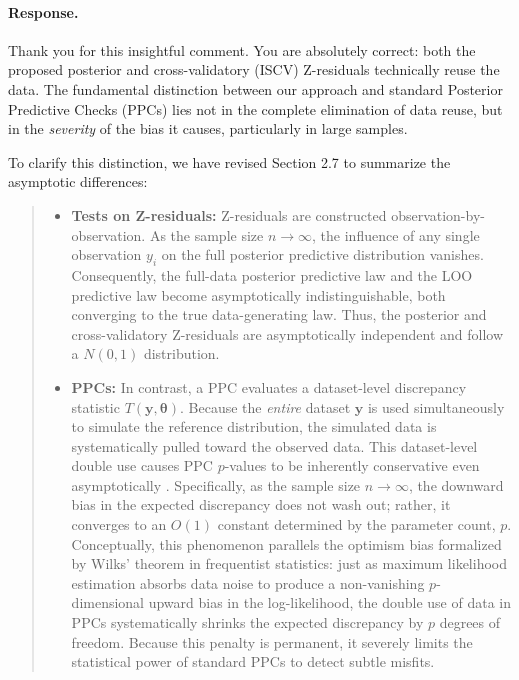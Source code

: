 \documentclass[11pt]{article}
\begin{document}
\paragraph{Response.}
Thank you for this insightful comment. You are absolutely correct: both the proposed posterior and cross-validatory (ISCV) Z-residuals technically reuse the data. The fundamental distinction between our approach and standard Posterior Predictive Checks (PPCs) lies not in the complete elimination of data reuse, but in the \textit{severity} of the bias it causes, particularly in large samples.

To clarify this distinction, we have revised Section 2.7 to summarize the asymptotic differences:

\begin{quote}
    
\begin{itemize}
    \item \textbf{Tests on Z-residuals:} Z-residuals are constructed observation-by-observation. As the sample size $n\to \infty$, the influence of any single observation $y_i$ on the full posterior predictive distribution vanishes. Consequently, the full-data posterior predictive law and the LOO predictive law become asymptotically indistinguishable, both converging to the true data-generating law. Thus, the posterior and cross-validatory Z-residuals are asymptotically independent and follow a $N(0,1)$ distribution.
    
    \item \textbf{PPCs:} In contrast, a PPC evaluates a dataset-level discrepancy statistic $T(\mathbf{y}, \boldsymbol{\theta})$. Because the \textit{entire} dataset $\mathbf{y}$ is used simultaneously to simulate the reference distribution, the simulated data is systematically pulled toward the observed data. This dataset-level double use causes PPC $p$-values to be inherently conservative even asymptotically \citep{Robins2000}. Specifically, as the sample size $n \to \infty$, the downward bias in the expected discrepancy does not wash out; rather, it converges to an $O(1)$ constant determined by the parameter count, $p$. Conceptually, this phenomenon parallels the optimism bias formalized by Wilks' theorem in frequentist statistics: just as maximum likelihood estimation absorbs data noise to produce a non-vanishing $p$-dimensional upward bias in the log-likelihood, the double use of data in PPCs systematically shrinks the expected discrepancy by $p$ degrees of freedom. Because this penalty is permanent, it severely limits the statistical power of standard PPCs to detect subtle misfits.
\end{itemize}
\end{quote}
\end{document}
